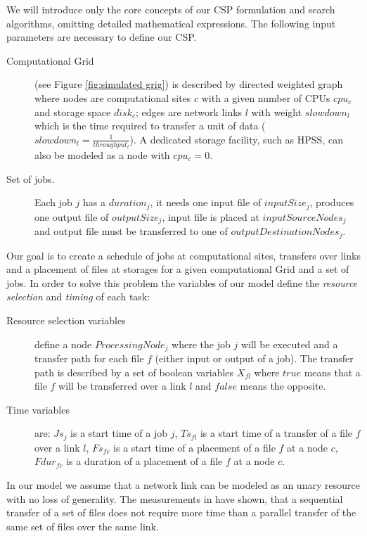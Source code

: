 \documentclass[english]{ddny}
\begin{document}
We will introduce only the core concepts of our CSP formulation and search algorithms, omitting  detailed mathematical expressions.
The following input parameters are necessary to define our CSP.
\begin{description}
\item[Computational Grid] (see Figure \ref{fig:simulated grig}) is described by directed weighted graph where nodes are computational sites $c$ with a given number of CPUs $cpu_{c}$ and storage space $disk_{c}$; edges are network links $l$ with weight $slowdown_{l}$ which is the time required to transfer a unit of data ($slowdown_{l}=\frac{1}{throughput_{l}}$). A dedicated storage facility, such as HPSS, can also be modeled as a node with $cpu_{c}=0$.
\item[Set of jobs.] Each job $j$ has a $duration_{j}$, it needs one input file of $inputSize_{j}$, produces one output file of $outputSize_{j}$, input file is placed at $inputSourceNodes_{j}$ and output file must be transferred to one of $outputDestinationNodes_{j}$.
\end{description}
Our goal is to create a schedule of jobs at computational sites, transfers over links and a placement of files at storages for a given computational Grid and a set of jobs. In order to solve this problem the variables of our model define the \textit{resource selection} and  \textit{timing} of each task:
\begin{description}
\item[Resource selection variables] define a node $ProcessingNode_{j}$ where the job $j$ will be executed and a transfer path for each file $f$ (either input or output of a job). The transfer path is described by a set of boolean variables $X_{fl}$ where $true$ means that a file $f$ will be transferred over a link $l$ and $false$ means the opposite.
\item[Time variables] are: $Js_{j}$ is a start time of a job $j$, $Ts_{fl}$ is a start time of a transfer of a file $f$ over a link $l$, $Fs_{fc}$ is a start time of a placement of a file $f$ at a node $c$, $Fdur_{fc}$ is a duration of a placement of a file $f$ at a node $c$.
\end{description} 	 
 In our model we assume that a network link can be modeled as an unary resource with no loss of generality. The measurements in \cite{Zerola} have shown, that  a sequential transfer of a set of files does not require more time than a parallel transfer of the same set of files over the same link.
\end{document}
